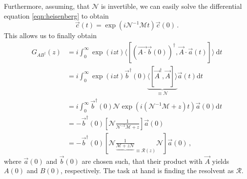 \documentclass[
    reprint, 
    aps,
    preprintnumbers,
    twocolumn,
    prb,
    superscriptaddress
]{revtex4-2}
\newcommand{\mM}{\mathcal{M}}
\newcommand{\mN}{\mathcal{N}}
\begin{document}
Furthermore, assuming, that $\mN$ is invertible, we can easily solve the differential equation \eqref{eqn:heisenberg} to obtain
\begin{equation}
    \vec{c}(t) = \exp \left( i \mN^{-1} \mM t \right) \vec{c}(0)\,.
\end{equation}
This allows us to finally obtain
\begin{align}
    \label{eqn:green_derivation}
    G_{AB^\dagger} (z) &= i \int_0^\infty \exp(izt) \langle [ (\vec{A \cdot} \vec{b}(0))^\dagger, \vec{A} \cdot \vec{a}(t) ] \rangle\ \mathrm{d}t \nonumber \\
        &= i \int_0^\infty \exp(izt) \vec{b}^\dagger(0) \underbrace{\langle [ \vec{A}^\dagger, \vec{A} ] \rangle}_{\equiv \mN} \vec{a}(t) \mathrm{d}t \nonumber \\
        &= i  \int_0^\infty \vec{b}^\dagger(0) \mN \exp \left( i \left(\mN^{-1} \mM + z \right) t \right) \vec{a}(0) \mathrm{d}t  \nonumber \\
        &= - \vec{b}^\dagger(0) \left[ \mN \frac{1}{\mN^{-1} \mM + z} \right] \vec{a}(0) \nonumber \\
        &= - \vec{b}^\dagger(0) \left[ \mN \frac{1}{ \underbrace{\mM + z \mN}}_{\equiv \mathcal{R}(z)} \mN \right] \vec{a}(0)\,,
\end{align}
where $\vec{a}(0)$ and $\vec{b}(0)$ are chosen such, that their product with $\vec{A}$ yields $A(0)$ and $B(0)$, respectively.
The task at hand is finding the resolvent as $\mathcal{R}$.
\end{document}
